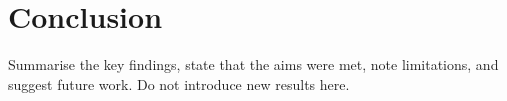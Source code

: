 \chapter{Conclusion}
\label{ch:conclusion}

Summarise the key findings, state that the aims were met, note limitations,
and suggest future work. Do not introduce new results here.

